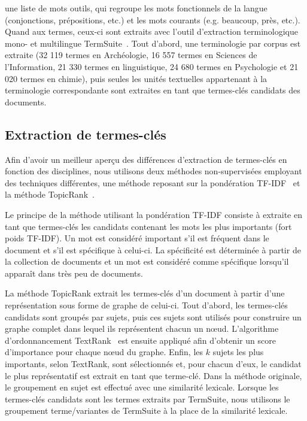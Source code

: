     une liste de mots outils, qui regroupe les mots fonctionnels de la langue
    (conjonctions, prépositions, etc.) et les mots courants (e.g.
    \og{}beaucoup\fg{}, \og{}près\fg{}, etc.). Quand aux termes, ceux-ci sont
    extraits avec l'outil d'extraction terminologique mono- et multilingue
    TermSuite~\cite{rocheteau2011termsuite}. Tout d'abord, une terminologie par
    corpus est extraite (32 119 termes en Archéologie, 16 557 termes en Sciences
    de l'Information, 21 330 termes en linguistique, 24 680 termes en
    Psychologie et 21 020 termes en chimie), puis seules les unités textuelles
    appartenant à la terminologie correspondante sont extraites en tant que
    termes-clés candidats des documents.

  \subsection{Extraction de termes-clés}
  \label{subsec:extraction_de_termes_cles}
    Afin d'avoir un meilleur aperçu des différences d'extraction de termes-clés
    en fonction des disciplines, nous utilisons deux méthodes non-supervisées
    employant des techniques différentes, une méthode reposant sur la
    pondération TF-IDF~\cite{jones1972tfidf} et la méthode
    TopicRank~\cite{bougouin2013topicrank}.

    Le principe de la méthode utilisant la pondération TF-IDF consiste à
    extraite en tant que termes-clés les candidats contenant les mots les plus
    importants (fort poids TF-IDF). Un mot est considéré important s'il est
    fréquent dans le document et s'il est spécifique à celui-ci. La spécificité
    est déterminée à partir de la collection de documents et un mot est
    considéré comme spécifique lorsqu'il apparaît dans très peu de documents.

    La méthode TopicRank extrait les termes-clés d'un document à partir d'une
    représentation sous forme de graphe de celui-ci. Tout d'abord, les
    termes-clés candidats sont groupés par sujets, puis ces sujets sont utilisés
    pour construire un graphe complet dans lequel ils représentent chacun un
    n\oe{}ud. L'algorithme d'ordonnancement
    TextRank~\cite{mihalcea2004textrank} est ensuite appliqué afin d'obtenir un
    score d'importance pour chaque n\oe{}ud du graphe. Enfin, les $k$ sujets les
    plus importants, selon TextRank, sont sélectionnés et, pour chacun d'eux, le
    candidat le plus représentatif est extrait en tant que terme-clé. Dans la
    méthode originale, le groupement en sujet est effectué avec une similarité
    lexicale. Lorsque les termes-clés candidats sont les termes extraits par
    TermSuite, nous utilisons le groupement terme/variantes de TermSuite à la
    place de la similarité lexicale.

